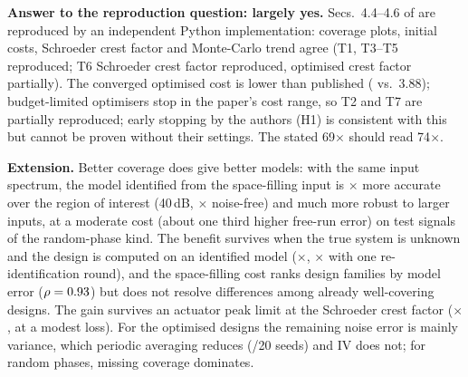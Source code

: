\textbf{Answer to the reproduction question: largely yes.} Secs.~4.4--4.6 of \citet{Kiss2024} are reproduced by an independent Python
implementation: coverage plots, initial costs, Schroeder crest factor and Monte-Carlo trend agree
(T1, T3--T5 reproduced; T6 Schroeder crest factor reproduced, optimised crest factor partially). The converged optimised cost is lower than published (\mCfullMed{} vs.\ 3.88);
budget-limited optimisers stop in the paper's cost range, so T2 and T7 are partially reproduced; early
stopping by the authors (H1) is consistent with this but cannot be proven without their settings. The stated 69$\times$ should read 74$\times$.

\textbf{Extension.} Better coverage does give better models: with the same input spectrum, the model
identified from the space-filling input is \mFOfullforty$\times$ more accurate over the region of
interest (40\,dB, \mFOfullinf$\times$ noise-free) and much more robust to larger inputs, at a moderate
cost (about one third higher free-run error) on test signals of the random-phase kind. The benefit survives when the true system is unknown and the design is computed on an
identified model (\mFOsurforty$\times$, \mFOiterforty$\times$ with one re-identification round), and the
space-filling cost ranks design families by model error ($\rho=0.93$) but does not resolve
differences among already well-covering designs. The gain survives an actuator peak limit at the Schroeder
crest factor (\mPkOneNineF$\times$, at a modest loss). For the optimised designs the remaining noise error is mainly
variance, which periodic averaging reduces (\mNRwinOfull/20 seeds) and IV does not; for random phases, missing
coverage dominates.

